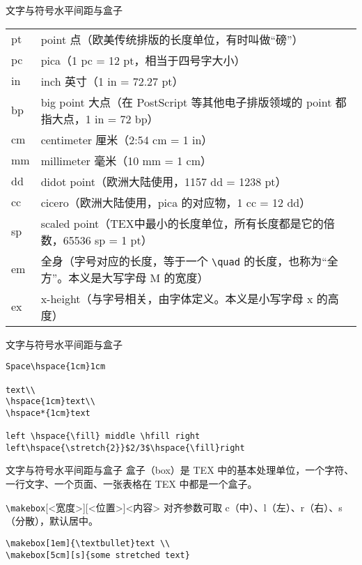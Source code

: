 \documentclass[11pt]{beamer}
\begin{document}
\begin{frame}[fragile]{文字与符号}{水平间距与盒子}
\begin{tabular}{lp{.9\linewidth}}
pt & point 点（欧美传统排版的长度单位，有时叫做“磅”） \\
pc & pica（1 pc = 12 pt，相当于四号字大小） \\
in & inch 英寸（1 in = 72.27 pt） \\
bp & big point 大点（在 PostScript 等其他电子排版领域的 point 都指大点，1 in = 72 bp） \\
cm & centimeter 厘米（2:54 cm = 1 in） \\
mm & millimeter 毫米（10 mm = 1 cm） \\
dd & didot point（欧洲大陆使用，1157 dd = 1238 pt） \\
cc & cicero（欧洲大陆使用，pica 的对应物，1 cc = 12 dd） \\
sp & scaled point（TEX中最小的长度单位，所有长度都是它的倍数，65536 sp = 1 pt） \\
em & 全身（字号对应的长度，等于一个 \verb|\quad| 的长度，也称为“全方”。本义是大写字母 M 的宽度） \\
ex & x-height（与字号相关，由字体定义。本义是小写字母 x 的高度） \\
\end{tabular}
\end{frame}

\begin{frame}[fragile]{文字与符号}{水平间距与盒子}
\begin{Verbatim}[tabsize=2]
Space\hspace{1cm}1cm

text\\
\hspace{1cm}text\\
\hspace*{1cm}text

left \hspace{\fill} middle \hfill right
left\hspace{\stretch{2}}$2/3$\hspace{\fill}right
\end{Verbatim}
\end{frame}

\begin{frame}[fragile]{文字与符号}{水平间距与盒子}
盒子（box）是 TEX 中的基本处理单位，一个字符、一行文字、一个页面、一张表格在 TEX 中都是一个盒子。
	
\verb|\makebox|[<宽度>][<位置>]{<内容>}
对齐参数可取 c（中）、l（左）、r（右）、s（分散），默认居中。
	
\begin{Verbatim}[tabsize=2]
\makebox[1em]{\textbullet}text \\
\makebox[5cm][s]{some stretched text}
\end{Verbatim}

\end{frame}
\end{document}
